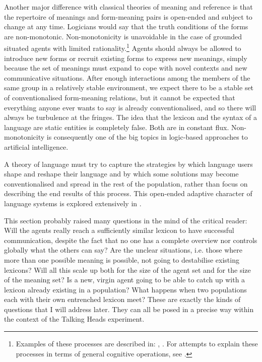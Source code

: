 Another major difference with classical theories of 
meaning and reference is 
that the repertoire of meanings and form-meaning pairs is open-ended
and subject to change at any time. Logicians would say that the 
truth conditions of the forms are non-monotonic. 
Non-monotonicity is unavoidable in the case of grounded 
situated agents with limited rationality.\footnote{Examples of these processes are described in: 
\cite{Bybee:1994}, \cite{Traugott:1991}.
For attempts to explain these  
processes in terms of general cognitive operations, see  
\cite{Heine:1997}.}
Agents should always be allowed to 
introduce new forms or recruit existing forms to express new
meanings, simply because the set of meanings must expand
to cope with novel contexts and new communicative
situations. After enough interactions among the 
members of the same group in a relatively stable 
environment, we expect there to be
a stable set of conventionalised form-meaning 
relations, but it cannot be
expected that everything anyone ever wants to say is
already conventionalised, and so there will always
be turbulence at the fringes. The idea that the lexicon
and the syntax of a language are static
entities is completely false. Both are in constant flux.
Non-monotonicity is consequently one of the big 
topics in logic-based approaches to artificial intelligence.

A theory of language must try 
to capture the strategies by which language users shape and 
reshape their language and by which some solutions may become 
conventionalised and spread in the rest of the population, 
rather than focus on describing the end results of 
this process. This open-ended adaptive character of 
language systems is explored extensively in . 

This section probably raised many questions in the 
mind of the critical reader: Will the agents really 
reach a sufficiently similar lexicon to have successful 
communication, despite the fact that no one has a 
complete overview nor controls globally what the others
can say? Are the unclear situations, i.e. those
where more than one possible meaning is possible, not 
going to destabilise existing lexicons? Will all this 
scale up both for the size of the agent set and for 
the size of the meaning set? Is a new, virgin agent 
going to be able to catch up with a lexicon already 
existing in a population? What happens when two 
populations each with their own entrenched lexicon meet? 
These are exactly the kinds of questions that I will 
address later. They can all be posed in a precise 
way within the context of the Talking Heads experiment.

